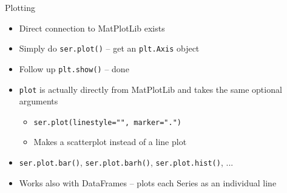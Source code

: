 \begin{frame}{Plotting}
%
\begin{itemize}
\item Direct connection to MatPlotLib exists
\item Simply do \texttt{ser.plot()} -- get an \texttt{plt.Axis} object
\item Follow up \texttt{plt.show()} -- done
\item \texttt{plot} is actually directly from MatPlotLib and takes the same optional arguments
	\begin{itemize}
	\item \eg \texttt{ser.plot(linestyle="", marker=".")}
	\item Makes a scatterplot instead of a line plot
	\end{itemize}
\item \texttt{ser.plot.bar()}, \texttt{ser.plot.barh()}, \texttt{ser.plot.hist()}, ...
\item Works also with DataFrames -- plots each Series as an individual line
\end{itemize}
%
\end{frame}


